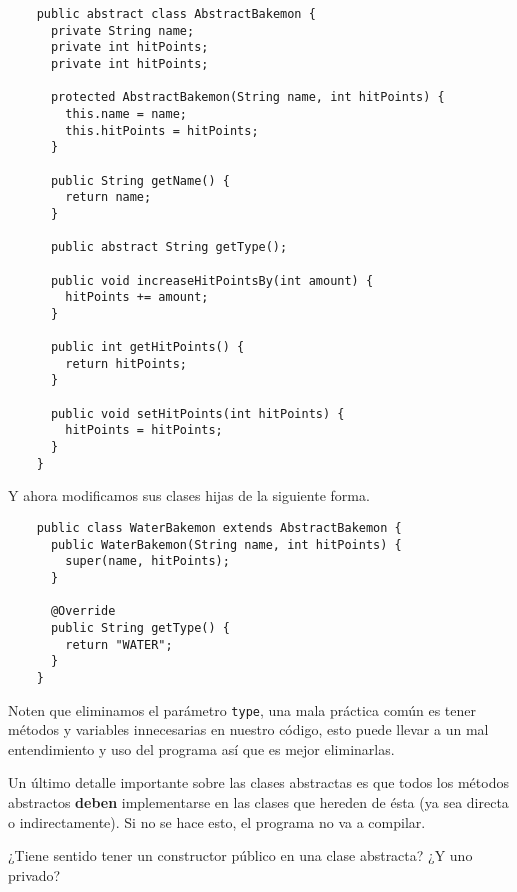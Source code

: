   \begin{verbatim}
    public abstract class AbstractBakemon {
      private String name;
      private int hitPoints;
      private int hitPoints;

      protected AbstractBakemon(String name, int hitPoints) {
        this.name = name;
        this.hitPoints = hitPoints;
      }

      public String getName() {
        return name;
      }

      public abstract String getType();

      public void increaseHitPointsBy(int amount) {
        hitPoints += amount;
      }

      public int getHitPoints() {
        return hitPoints;
      }

      public void setHitPoints(int hitPoints) {
        hitPoints = hitPoints;
      }
    }
  \end{verbatim}

  Y ahora modificamos sus clases hijas de la siguiente forma.

  \begin{verbatim}
    public class WaterBakemon extends AbstractBakemon {
      public WaterBakemon(String name, int hitPoints) {
        super(name, hitPoints);
      }

      @Override
      public String getType() {
        return "WATER";
      }
    }
  \end{verbatim}

  Noten que eliminamos el parámetro \texttt{type}, una mala práctica común es tener métodos y 
  variables innecesarias en nuestro código, esto puede llevar a un mal entendimiento y uso del 
  programa así que es mejor eliminarlas.

  Un último detalle importante sobre las clases abstractas es que todos los métodos abstractos 
  \textbf{deben} implementarse en las clases que hereden de ésta (ya sea directa o indirectamente).
  Si no se hace esto, el programa no va a compilar.

  \begin{exercise}
    ¿Tiene sentido tener un constructor público en una clase abstracta?
    ¿Y uno privado?
  \end{exercise}
%